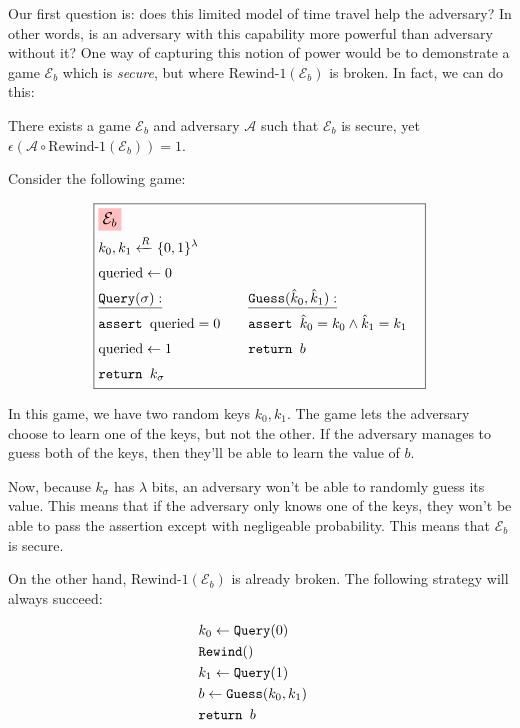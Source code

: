 Our first question is: does this limited model of time travel help
the adversary?
In other words, is an adversary with this capability more powerful
than adversary without it? 
One way of capturing this notion of power would be to demonstrate
a game $\mathcal{E}_b$ which is \emph{secure}, but where
$\text{Rewind-1}(\mathcal{E}_b)$ is broken.
In fact, we can do this:

\begin{claim}
    \label{claim:rewind-1-is-stronger}
    There exists a game $\mathcal{E}_b$ and adversary $\mathcal{A}$ such that 
    $\mathcal{E}_b$ is secure, yet $\epsilon(\mathcal{A} \circ \text{Rewind-1}(\mathcal{E}_b)) = 1$.
\end{claim}

Consider the following game:

\begin{game}
\captionsetup{justification=centering}
$$
\boxed{
\begin{aligned}
&\colorbox{pink}{\large $\mathcal{E}_b$}\cr
&k_0, k_1 \xleftarrow{R} \{0, 1\}^\lambda\cr
&\text{queried} \gets 0\cr
&\begin{aligned}
    &\underline{\texttt{Query}(\sigma):}\cr
    &\texttt{assert } \text{queried} = 0\cr
    &\text{queried} \gets 1\cr
    &\texttt{return } k_\sigma\cr
\end{aligned}
&\begin{aligned}
    &\underline{\texttt{Guess}(\hat{k}_0, \hat{k}_1):}\cr
    &\texttt{assert } \hat{k}_0 = k_0 \land \hat{k}_1 = k_1\cr
    &\texttt{return } b\cr
    &\cr
\end{aligned}\cr
\end{aligned}
}
$$
\end{game}

In this game, we have two random keys $k_0, k_1$.
The game lets the adversary choose to learn one of the keys, but not
the other.
If the adversary manages to guess both of the keys, then they'll be
able to learn the value of $b$.

Now, because $k_\sigma$ has $\lambda$ bits, an adversary won't be able
to randomly guess its value.
This means that if the adversary only knows one of the keys, they won't
be able to pass the assertion except with negligeable probability.
This means that $\mathcal{E}_b$ is secure.

On the other hand, $\text{Rewind-1}(\mathcal{E}_b)$ is already broken.
The following strategy will always succeed:

$$
\begin{aligned}
&k_0 \gets \texttt{Query}(0)\cr
&\texttt{Rewind}()\cr
&k_1 \gets \texttt{Query}(1)\cr
&b \gets \texttt{Guess}(k_0, k_1)\cr
&\texttt{return } b\cr
\end{aligned}
$$

